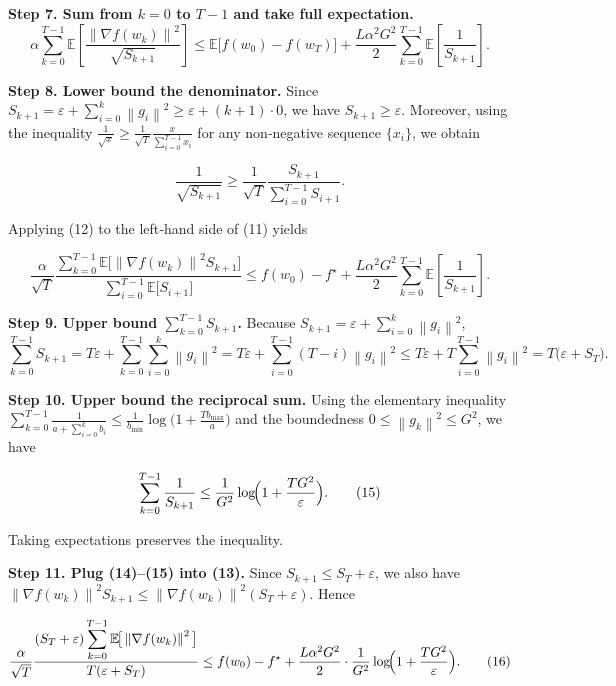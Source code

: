 \documentclass{article}
\newcommand{\E}{\mathbb{E}}
\newcommand{\norm}[1]{\left\lVert#1\right\rVert}
\begin{document}
\noindent\textbf{Step 7. Sum from $k=0$ to $T-1$ and take full expectation.}
\[
\alpha\sum_{k=0}^{T-1}\E\!\left[\frac{\norm{\nabla f(w_k)}^{2}}{\sqrt{S_{k+1}}}\right]
\le \E\!\big[f(w_0)-f(w_T)\big]
+\frac{L\alpha^{2}G^{2}}{2}\sum_{k=0}^{T-1}\E\!\left[\frac{1}{S_{k+1}}\right].
\tag{11}
\]

\noindent\textbf{Step 8. Lower bound the denominator.}  
Since $S_{k+1}= \varepsilon+\sum_{i=0}^{k}\norm{g_i}^{2}\ge \varepsilon+(k+1) \cdot 0$, we have $S_{k+1}\ge \varepsilon$. Moreover, using the inequality $\frac{1}{\sqrt{x}}\ge\frac{1}{\sqrt{T}}\frac{x}{\sum_{i=0}^{T-1}x_i}$ for any non‑negative sequence $\{x_i\}$, we obtain

\[
\frac{1}{\sqrt{S_{k+1}}}\ge\frac{1}{\sqrt{T}}\frac{S_{k+1}}{\sum_{i=0}^{T-1}S_{i+1}}.
\tag{12}
\]

Applying (12) to the left‑hand side of (11) yields

\[
\frac{\alpha}{\sqrt{T}}\frac{\displaystyle\sum_{k=0}^{T-1}\E\!\big[\norm{\nabla f(w_k)}^{2}S_{k+1}\big]}
{\displaystyle\sum_{i=0}^{T-1}\E\!\big[S_{i+1}\big]}
\le f(w_0)-f^{\star}
+\frac{L\alpha^{2}G^{2}}{2}\sum_{k=0}^{T-1}\E\!\left[\frac{1}{S_{k+1}}\right].
\tag{13}
\]

\noindent\textbf{Step 9. Upper bound $\sum_{k=0}^{T-1} S_{k+1}$.}  
Because $S_{k+1}= \varepsilon+\sum_{i=0}^{k}\norm{g_i}^{2}$,
\[
\sum_{k=0}^{T-1} S_{k+1}
= T\varepsilon+\sum_{k=0}^{T-1}\sum_{i=0}^{k}\norm{g_i}^{2}
= T\varepsilon+\sum_{i=0}^{T-1}(T-i)\norm{g_i}^{2}
\le T\varepsilon+T\sum_{i=0}^{T-1}\norm{g_i}^{2}
= T\big(\varepsilon+ S_T\big).
\tag{14}
\]

\noindent\textbf{Step 10. Upper bound the reciprocal sum.}  
Using the elementary inequality $\sum_{k=0}^{T-1}\frac{1}{a+\sum_{i=0}^{k}b_i}\le \frac{1}{b_{\min}}\log\!\big(1+\frac{T b_{\max}}{a}\big)$ and the boundedness $0\le\norm{g_k}^{2}\le G^{2}$, we have

\[
\sum_{k=0}^{T-1}\frac{1}{S_{k+1}}
\le \frac{1}{G^{2}}\log\!\Bigl(1+\frac{T G^{2}}{\varepsilon}\Bigr).
\tag{15}
\]

Taking expectations preserves the inequality.

\noindent\textbf{Step 11. Plug (14)–(15) into (13).}  
Since $S_{k+1}\le S_T+\varepsilon$, we also have $\norm{\nabla f(w_k)}^{2}S_{k+1}\le \norm{\nabla f(w_k)}^{2}(S_T+\varepsilon)$. Hence

\[
\frac{\alpha}{\sqrt{T}}\frac{(S_T+\varepsilon)\displaystyle\sum_{k=0}^{T-1}\E\!\big[\norm{\nabla f(w_k)}^{2}\big]}
{T(\varepsilon+S_T)}
\le f(w_0)-f^{\star}
+\frac{L\alpha^{2}G^{2}}{2}\cdot\frac{1}{G^{2}}\log\!\Bigl(1+\frac{T G^{2}}{\varepsilon}\Bigr).
\tag{16}
\]
\end{document}
